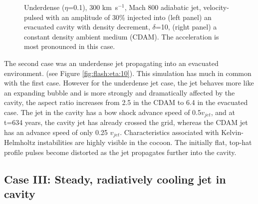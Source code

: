 \begin{figure}[t]
\begin{center}
\begin{minipage}[t]{.48\linewidth}
   \end{minipage} \hfill
\hfill
\caption{
Underdense ($\eta$=0.1), 300 km~s$^{-1}$, Mach 800  adiabatic jet, velocity-pulsed with an amplitude of 30\% injected into
(left panel)
an evacuated cavity with density decrement, $\delta$=10, 
(right panel)
a constant density ambient medium (CDAM).
The acceleration is most pronounced in this case.
}
\label{fig:flash:eta:0.1}       %
\end{center}
\end{figure}



The second case was an underdense jet propagating into an evacuated environment. 
(see Figure \ref{fig:flash:eta:10}).
This simulation has much in common with the first case. However for the underdense jet case, the jet behaves more like an expanding bubble and is more strongly and dramatically affected by the cavity, the aspect ratio increases from 2.5 in the CDAM to 6.4 in the evacuated case.
The jet in the cavity has a bow shock advance speed of 0.5$v_{jet}$, and
at t=634 years, the cavity jet has already crossed the grid, whereas the CDAM jet has an advance speed of only 0.25 $v_{jet}$.
Characteristics associated with Kelvin-Helmholtz instabilities are highly visible in the cocoon.
The initially flat, top-hat profile pulses become distorted as the jet propagates further into the cavity.


\subsection{Case III: Steady, radiatively cooling jet in cavity}

